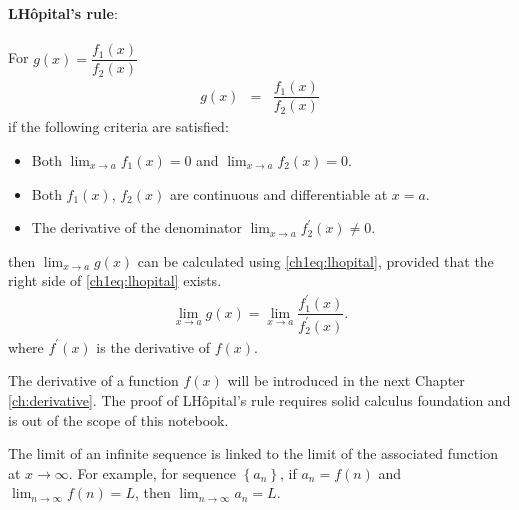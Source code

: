 \begin{mdframed}
\textbf{L\textprime H\^opital's rule}:
\\
\\
\noindent For $g(x)=\dfrac{f_1(x)}{f_2(x)}$
\begin{eqnarray}
  g(x) &=& \dfrac{f_1(x)}{f_2(x)} \nonumber
\end{eqnarray}
if the following criteria are satisfied:
\begin{itemize}
  \item Both $\lim_{x\rightarrow a}f_1(x) = 0$ and $\lim_{x\rightarrow a}f_2(x) = 0$.
  \item Both $f_1(x)$, $f_2(x)$ are continuous and differentiable at $x=a$.
  \item The derivative of the denominator $\lim_{x\rightarrow a}f_2^\prime(x) \neq 0$.
\end{itemize}
then $\lim_{x\rightarrow a}g(x)$ can be calculated using \eqref{ch1eq:lhopital}, provided that the right side of \eqref{ch1eq:lhopital} exists.
\begin{eqnarray}
  \lim_{x\rightarrow a}g(x) = \lim_{x\rightarrow a} \dfrac{f_1^\prime(x)}{f_2^\prime(x)}. \label{ch1eq:lhopital}
\end{eqnarray}
where $f^\prime(x)$ is the derivative of $f(x)$.
\end{mdframed}

The derivative of a function $f(x)$ will be introduced in the next Chapter \ref{ch:derivative}. The proof of L\textprime H\^opital's rule requires solid calculus foundation and is out of the scope of this notebook.

The limit of an infinite sequence is linked to the limit of the associated function at $x\rightarrow\infty$. For example, for sequence $\left\{a_n\right\}$, if $a_n=f(n)$ and $\lim_{n\rightarrow\infty}f(n)=L$, then $\lim_{n\rightarrow\infty}a_n=L$.
